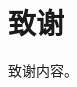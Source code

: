 \documentclass[a4paper,12pt]{report}
\begin{document}
\chapter{致谢}
	\begin{spacing}{1.5}
	\songti{}
	致谢内容。
	\end{spacing}





		
\end{document}
